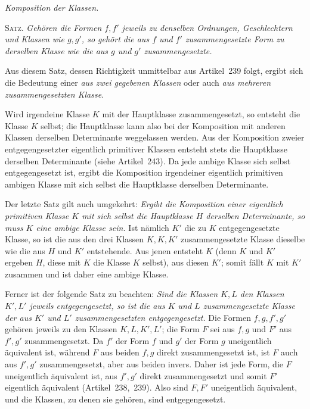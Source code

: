 \begin{center}
\textit{Komposition der Klassen.}
\end{center}

\textsc{Satz.} \textit{Gehören die Formen $f,f'$ jeweils zu denselben Ordnungen, Geschlechtern und Klassen wie $g,g'$, so gehört die aus $f$ und $f'$ zusammengesetzte Form zu derselben Klasse wie die aus $g$ und $g'$ zusammengesetzte.}

Aus diesem Satz, dessen Richtigkeit unmittelbar aus Artikel~239 folgt, ergibt sich die Bedeutung einer \textit{aus zwei gegebenen Klassen} oder auch \textit{aus mehreren zusammengesetzten Klasse}.

Wird irgendeine Klasse $K$ mit der Hauptklasse zusammengesetzt, so entsteht die Klasse $K$ selbst; die Hauptklasse kann also bei der Komposition mit anderen Klassen derselben Determinante weggelassen werden. Aus der Komposition zweier entgegengesetzter eigentlich primitiver Klassen entsteht stets die Hauptklasse derselben Determinante (siehe Artikel~243). Da jede ambige Klasse sich selbst entgegengesetzt ist, ergibt die Komposition irgendeiner eigentlich primitiven ambigen Klasse mit sich selbst die Hauptklasse derselben Determinante.

Der letzte Satz gilt auch umgekehrt: \textit{Ergibt die Komposition einer eigentlich primitiven Klasse $K$ mit sich selbst die Hauptklasse $H$ derselben Determinante, so muss $K$ eine ambige Klasse sein.} Ist nämlich $K'$ die zu $K$ entgegengesetzte Klasse, so ist die aus den drei Klassen $K,K,K'$ zusammengesetzte Klasse dieselbe wie die aus $H$ und $K'$ entstehende. Aus jenen entsteht $K$ (denn $K$ und $K'$ ergeben $H$, diese mit $K$ die Klasse $K$ selbst), aus diesen $K'$; somit fällt $K$ mit $K'$ zusammen und ist daher eine ambige Klasse.

Ferner ist der folgende Satz zu beachten: \textit{Sind die Klassen $K,L$ den Klassen $K',L'$ jeweils entgegengesetzt, so ist die aus $K$ und $L$ zusammengesetzte Klasse der aus $K'$ und $L'$ zusammengesetzten entgegengesetzt.} Die Formen $f,g,f',g'$ gehören jeweils zu den Klassen $K,L,K',L'$; die Form $F$ sei aus $f,g$ und $F'$ aus $f',g'$ zusammengesetzt. Da $f'$ der Form $f$ und $g'$ der Form $g$ uneigentlich äquivalent ist, während $F$ aus beiden $f,g$ direkt zusammengesetzt ist, ist $F$ auch aus $f',g'$ zusammengesetzt, aber aus beiden invers. Daher ist jede Form, die $F$ uneigentlich äquivalent ist, aus $f',g'$ direkt zusammengesetzt und somit $F'$ eigentlich äquivalent (Artikel~238,~239). Also sind $F,F'$ uneigentlich äquivalent, und die Klassen, zu denen sie gehören, sind entgegengesetzt.

